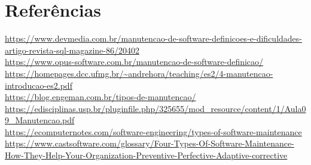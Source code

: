 \section{Referências}
\url{https://www.devmedia.com.br/manutencao-de-software-definicoes-e-dificuldades-artigo-revista-sql-magazine-86/20402} \\
\url{https://www.opus-software.com.br/manutencao-de-software-definicao/} \\
\url{https://homepages.dcc.ufmg.br/~andrehora/teaching/es2/4-manutencao-introducao-es2.pdf} \\
\url{https://blog.engeman.com.br/tipos-de-manutencao/}
\url{https://edisciplinas.usp.br/pluginfile.php/325655/mod_resource/content/1/Aula09_Manutencao.pdf} \\
\url{https://ecomputernotes.com/software-engineering/types-of-software-maintenance} \\
\url{https://www.castsoftware.com/glossary/Four-Types-Of-Software-Maintenance-How-They-Help-Your-Organization-Preventive-Perfective-Adaptive-corrective}

